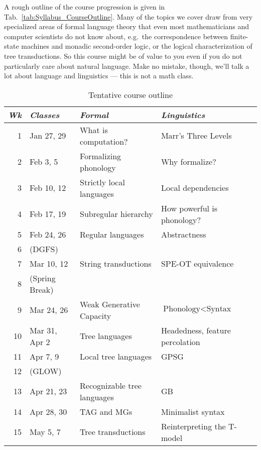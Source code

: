 A rough outline of the course progression is given in Tab.~\vref{tab:Syllabus_CourseOutline}.
Many of the topics we cover draw from very specialized areas of formal language theory that even most mathematicians and computer scientists do not know about, e.g.\ the correspondence between finite-state machines and monadic second-order logic, or the logical characterization of tree transductions.
So this course might be of value to you even if you do not particularly care about natural language.
Make no mistake, though, we'll talk a lot about language and linguistics --- this is not a math class.

\begin{table}
    \centering
    \begin{tabular}{rlp{4.5cm}p{4.5cm}}
        \toprule
        \emph{Wk} & \emph{Classes} & \emph{Formal} & \emph{Linguistics} \\
        \toprule
        1         & Jan 27, 29     & What is computation? & Marr's Three Levels\\
        2         & Feb 3, 5       & Formalizing phonology & Why formalize?\\
        3         & Feb 10, 12     & Strictly local languages & Local dependencies\\
        4         & Feb 17, 19     & Subregular hierarchy & How powerful is phonology?\\
        5         & Feb 24, 26     & Regular languages & Abstractness\\
        6         & (DGFS)         & & \\
        7         & Mar 10, 12     & String transductions & SPE-OT equivalence\\
        \midrule
        8         & (Spring Break) & & \\
        \midrule
        9         & Mar 24, 26     & Weak Generative Capacity & $\text{Phonology} < \text{Syntax}$\\
        10        & Mar 31, Apr 2  & Tree languages & Headedness, feature percolation\\
        11        & Apr 7, 9       & Local tree languages & GPSG\\
        12        & (GLOW)         & & \\
        13        & Apr 21, 23     & Recognizable tree languages & GB\\
        14        & Apr 28, 30     & TAG and MGs & Minimalist syntax\\
        15        & May 5, 7       & Tree transductions & Reinterpreting the T-model\\
        \bottomrule
    \end{tabular}
\caption{Tentative course outline}
\label{tab:Syllabus_CourseOutline}
\end{table}

